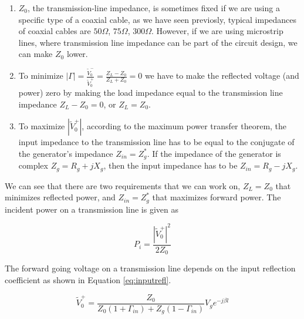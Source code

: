\documentclass{ximera}
\begin{document}
\begin{enumerate}
\item $Z_0$, the transmission-line impedance, is sometimes fixed if we are using a specific type of a coaxial cable, as we have seen previosly, typical impedances of coaxial cables are $50\Omega$, $75\Omega$, $300\Omega$. However, if we are using microstrip lines, where  transmission line impedance can be part of the circuit design, we can make $Z_0$ lower.
\item To minimize $|\Gamma|=\frac{\tilde{V}_0^-}{\tilde{V}_0^+} =\frac{Z_L-Z_0}{Z_L+Z_0}=0$ we have to make the reflected voltage (and power) zero by making the load impedance equal to the transmission line impedance $Z_L-Z_0=0$, or $Z_L=Z_0$. 
\item To maximize $|\tilde{V}_0^+|$, according to the maximum power transfer theorem, the input impedance to the transmission line has to be equal to the conjugate of the generator's impedance $Z_{in}=Z_{g}^*$. If the impedance of the generator is complex $Z_g=R_g+jX_g$, then the input impedance has to be $Z_{in}=R_g-jX_g$.
\end{enumerate}

We can see that there are two requirements that we can work on, $Z_L=Z_0$ that minimizes reflected power,  and $Z_{in}=Z_g^*$ that maximizes forward power. The incident power on a  transmission line is given as

\begin{equation}
P_i=\frac{|\tilde{V}_0^+|^2}{2 Z_0}
\end{equation}


The forward going voltage on a transmission line depends on the input reflection coefficient as shown in Equation \ref{eq:inputrefl}.

\begin{equation}
\tilde{V}_0^+=\frac{Z_0}{Z_0(1+\Gamma_{in})+Z_g(1-\Gamma_{in})}V_g e^{-j\beta l}\label{eq:inputrefl}
\end{equation}
\end{document}
